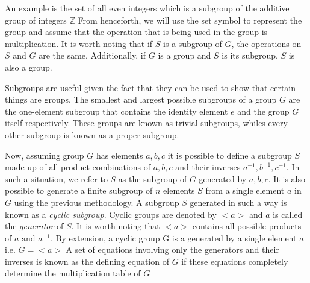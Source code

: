 \documentclass[fontsize=12pt]{article}
\begin{document}
 An example is the set of all even integers which is a subgroup of the additive group
 of integers $\mathbb{Z}$
 From henceforth, we will use the set symbol to represent the group and assume that
 the operation that is being used in the group is multiplication. 
 It is worth noting that if $S$ is a subgroup of $G$, the operations on $S$ and $G$
 are the same. Additionally, if $G$ is a group and $S$ is its subgroup, $S$ is also a 
 group.
 
 Subgroups are useful given the fact that they can be used to show that certain things
 are groups. The smallest and largest possible subgroups of a group $G$ are the
 one-element subgroup that contains the identity element $e$ and the group $G$
 itself respectively. These groups are known as trivial subgroups, whiles every other 
 subgroup is known as a proper subgroup.
 
 Now, assuming group $G$ has elements $a,b,c$ it is possible to define a subgroup
 $S$ made up of all product combinations of $a,b,c$ and their inverses $a^{-1},
 b^{-1},c^{-1}$. In such a situation, we refer to $S$ as the subgroup of $G$ 
 generated by $a,b,c$. It is also possible to generate a finite subgroup of $n$ 
 elements $S$ from a single element $a$ in $G$ using the previous methodology. A
 subgroup $S$ generated in such a way is known as a \textit{cyclic subgroup}. 
 Cyclic groups are denoted by $<a>$ and $a$ is called the \textit{generator} of $S$.
 It is worth noting that $<a>$ contains all possible products of $a \text{ and } 
 a^{-1}$.
 By extension, a cyclic group G is a generated by a single element $a$ i.e. $G=<a>$
 A set of equations involving only the generators and their inverses is known as the
 defining equation of $G$ if these equations completely determine the multiplication
 table of $G$
 
\end{document}
